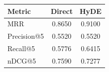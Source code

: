 \begin{tabular}{lcc}
\hline
Metric & Direct & HyDE \\
\hline
MRR & 0.8650 & 0.9100 \\
Precision@5 & 0.5520 & 0.5520 \\
Recall@5 & 0.5776 & 0.6415 \\
nDCG@5 & 0.7590 & 0.7277 \\
\hline
\end{tabular}

